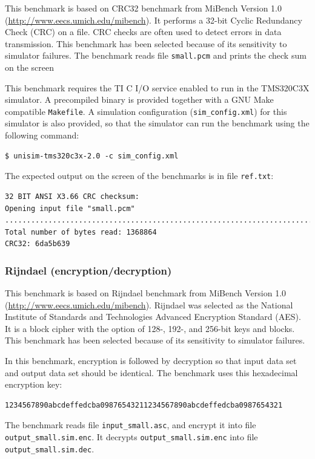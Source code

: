 This benchmark is based on CRC32 benchmark from MiBench Version 1.0 (\url{http://www.eecs.umich.edu/mibench}).
It performs a 32-bit Cyclic Redundancy Check (CRC) on a file. 
CRC checks are often used to detect errors in data transmission.
This benchmark has been selected because of its sensitivity to simulator failures.
The benchmark reads file \texttt{small.pcm} and prints the check sum on the screen

This benchmark requires the TI C I/O service enabled to run in the TMS320C3X simulator.
A precompiled binary is provided together with a GNU Make compatible \texttt{Makefile}.
A simulation configuration (\texttt{sim\_config.xml}) for this simulator is also provided, so that the simulator can run the benchmark using the following command:

\begin{verbatim}
$ unisim-tms320c3x-2.0 -c sim_config.xml
\end{verbatim}

\noindent The expected output on the screen of the benchmarks is in file \texttt{ref.txt}:

\begin{verbatim}
32 BIT ANSI X3.66 CRC checksum:
Opening input file "small.pcm"
....................................................................................
Total number of bytes read: 1368864
CRC32: 6da5b639
\end{verbatim}

\subsubsection{Rijndael (encryption/decryption)}

This benchmark is based on Rijndael benchmark from MiBench Version 1.0 (\url{http://www.eecs.umich.edu/mibench}).
Rijndael was selected as the National Institute of Standards and Technologies Advanced Encryption Standard (AES).
It is a block cipher with the option of 128-, 192-, and 256-bit keys and blocks.
This benchmark has been selected because of its sensitivity to simulator failures.

In this benchmark, encryption is followed by decryption so that input data set and output data set should be identical.
The benchmark uses this hexadecimal encryption key:
\begin{verbatim}
1234567890abcdeffedcba09876543211234567890abcdeffedcba0987654321
\end{verbatim}
The benchmark reads file \texttt{input\_small.asc}, and encrypt it into file \texttt{output\_small.sim.enc}.
It decrypts \texttt{output\_small.sim.enc} into file \texttt{output\_small.sim.dec}.

